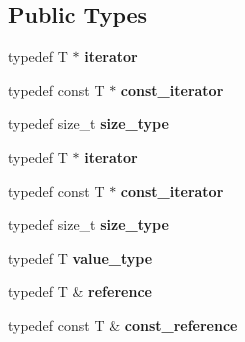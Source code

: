 \subsection*{Public Types}
\begin{DoxyCompactItemize}
\item 
\mbox{\label{classVec_a18d486e3211b998ce0dd000d95dddbbe}} 
typedef T $\ast$ {\bfseries iterator}
\item 
\mbox{\label{classVec_a5208b137cec99b13ba74273cbdd564e4}} 
typedef const T $\ast$ {\bfseries const\+\_\+iterator}
\item 
\mbox{\label{classVec_aef386c702dd7e780c408c9cdb4cd0f40}} 
typedef size\+\_\+t {\bfseries size\+\_\+type}
\item 
\mbox{\label{classVec_a18d486e3211b998ce0dd000d95dddbbe}} 
typedef T $\ast$ {\bfseries iterator}
\item 
\mbox{\label{classVec_a5208b137cec99b13ba74273cbdd564e4}} 
typedef const T $\ast$ {\bfseries const\+\_\+iterator}
\item 
\mbox{\label{classVec_aef386c702dd7e780c408c9cdb4cd0f40}} 
typedef size\+\_\+t {\bfseries size\+\_\+type}
\item 
\mbox{\label{classVec_a82bc529990b6ed767d347249381e6159}} 
typedef T {\bfseries value\+\_\+type}
\item 
\mbox{\label{classVec_a604b2b35fed38bcf9d18a51fb5a673cc}} 
typedef T \& {\bfseries reference}
\item 
\mbox{\label{classVec_a53eb22e4c8038c002212fef30490c109}} 
typedef const T \& {\bfseries const\+\_\+reference}
\end{DoxyCompactItemize}
